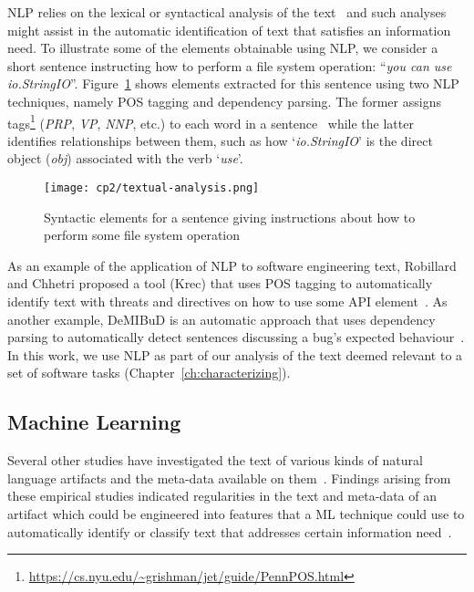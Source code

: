 \acf{NLP} relies on the lexical or syntactical analysis of the text~\cite{jurafsky2014speech}
and such analyses might assist in the automatic identification of text that satisfies an information need. 
To illustrate some of the elements obtainable using \acs{NLP}, we consider a short sentence 
instructing how to perform a file system operation: ``\textit{you can use io.StringIO}''.
Figure~\ref{fig:nlp-analysis} shows elements extracted for this sentence using two \acs{NLP} techniques,
namely \acf{POS} tagging and dependency parsing.
The former assigns tags\footnote{\url{https://cs.nyu.edu/~grishman/jet/guide/PennPOS.html}} ({\small \textit{PRP}, \textit{VP}, \textit{NNP},} etc.) to each word 
in a sentence~\cite{taylor2003penn} while the latter identifies
relationships between them, such as how 
`\textit{io.StringIO}' is the direct object (\textit{obj})
associated with the verb `\textit{use}'.



\begin{figure}[h!]
    \centering
    \texttt{[image: cp2/textual-analysis.png]}
    \caption{Syntactic elements for a sentence giving instructions about how to perform some file system operation}
    \label{fig:nlp-analysis}
\end{figure}


As an example of the application of \ac{NLP} to software engineering text,
Robillard  and Chhetri proposed a tool (Krec)
that uses \acs{POS} tagging to automatically 
identify text with threats and directives on how to use some API element~\cite{Robillard2015}.
As another example, {\small DeMIBuD}
is an automatic approach that uses dependency parsing
to automatically detect sentences discussing a bug's expected behaviour~\cite{Chaparro2017}.
In this work, we use \acs{NLP} as part of our 
analysis of the text deemed relevant to a set of software tasks (Chapter~\ref{ch:characterizing}).



\subsection{Machine Learning }
\label{cp2:machine-learning}



Several other studies have investigated the text 
of various kinds of natural language artifacts and 
the meta-data available on them~\cite{Ko2006, Maalej2013, Arya2019}.
Findings arising from these empirical studies
indicated regularities in the text and meta-data of 
an artifact which could be engineered into 
features that a  \acf{ML} technique could use to automatically identify or classify
text that addresses certain information need~\cite{Bavota2016}. 



